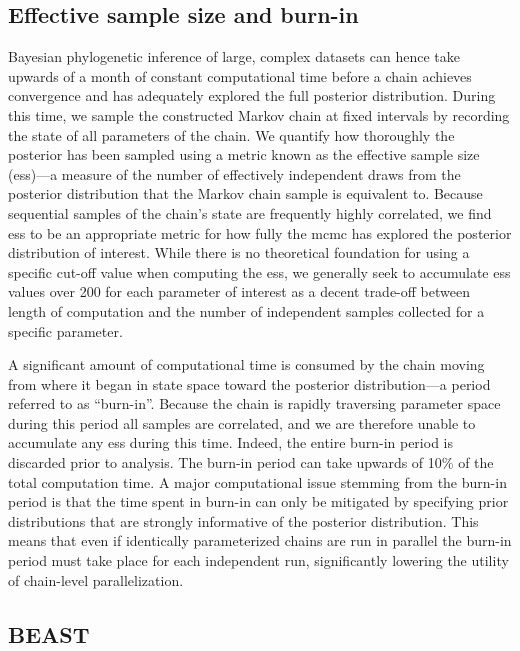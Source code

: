 \subsection{Effective sample size and burn-in}
\label{sec:ess}

Bayesian phylogenetic inference of large, complex datasets can hence take upwards of a month of constant computational time before a chain achieves convergence and has adequately explored the full posterior distribution.
During this time, we sample the constructed Markov chain at fixed intervals by recording the state of all parameters of the chain.
We quantify how thoroughly the posterior has been sampled using a metric known as the effective sample size (\gls{ess})---a measure of the number of effectively independent draws from the posterior distribution that the Markov chain sample is equivalent to.
Because sequential samples of the chain's state are frequently highly correlated, we find \gls{ess} to be an appropriate metric for how fully the \gls{mcmc} has explored the posterior distribution of interest.
While there is no theoretical foundation for using a specific cut-off value when computing the \gls{ess}, we generally seek to accumulate \gls{ess} values over 200 for each parameter of interest as a decent trade-off between length of computation and the number of independent samples collected for a specific parameter.

A significant amount of computational time is consumed by the chain moving from where it began in state space toward the posterior distribution---a period referred to as ``burn-in''.
Because the chain is rapidly traversing parameter space during this period all samples are correlated, and we are therefore unable to accumulate any \gls{ess} during this time.
Indeed, the entire burn-in period is discarded prior to analysis.
The burn-in period can take upwards of 10\% of the total computation time.
A major computational issue stemming from the burn-in period is that the time spent in burn-in can only be mitigated by specifying prior distributions that are strongly informative of the posterior distribution.
This means that even if identically parameterized chains are run in parallel the burn-in period must take place for each independent run, significantly lowering the utility of chain-level parallelization.

\subsection{BEAST}

